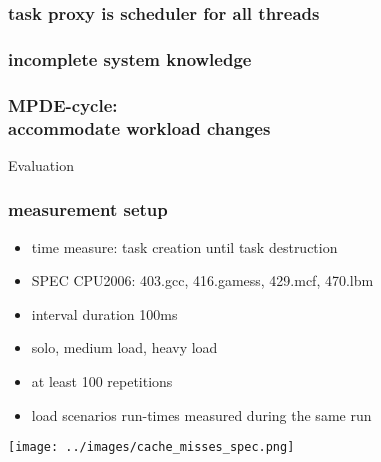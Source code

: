 \documentclass[utf8,10pt,aspectratio=169]{beamer}
\begin{document}
\begin{frame}
  \frametitle{task proxy is scheduler for all threads}
  \centering
  
\end{frame}


\begin{frame}
  \frametitle{incomplete system knowledge}
  \centering
  
\end{frame}


\begin{frame}
  \frametitle{MPDE-cycle:\\ accommodate workload changes}
  \centering
  
\end{frame}

\begin{frame}
  \centering
  \Large
  Evaluation
\end{frame}

\begin{frame}
  \frametitle{measurement setup}
  \begin{itemize}
  \setlength{\itemsep}{6pt}
    \item time measure: task creation until task destruction
    \item SPEC CPU2006: 403.gcc, 416.gamess, 429.mcf, 470.lbm
    \item interval duration 100ms
    \item solo, medium load, heavy load
    \item at least 100 repetitions
    \item load scenarios run-times measured during the same run
  \end{itemize}
\end{frame}


\begin{frame}
  \centering
  \texttt{[image: ../images/cache\_misses\_spec.png]}
\end{frame}
\end{document}
